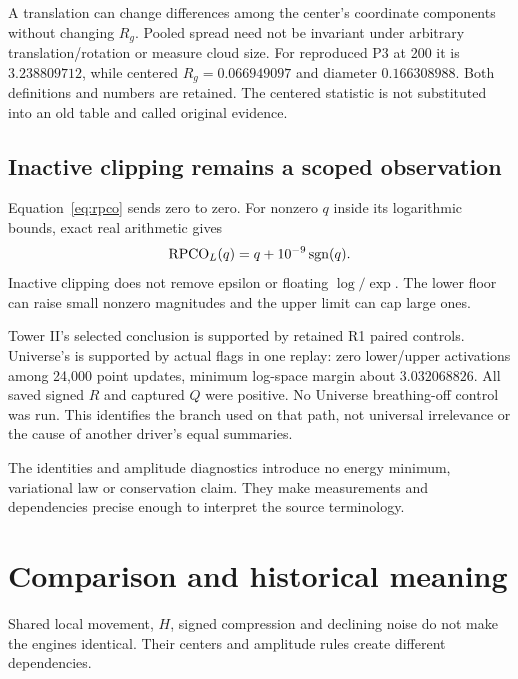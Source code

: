 A translation can change differences among the center's coordinate components without changing \(R_g\). Pooled spread need not be invariant under arbitrary translation/rotation or measure cloud size. For reproduced P3 at 200 it is \(3.238809712\), while centered \(R_g=0.066949097\) and diameter \(0.166308988\). Both definitions and numbers are retained. The centered statistic is not substituted into an old table and called original evidence.

\subsection{Inactive clipping remains a scoped observation}
Equation~\eqref{eq:rpco} sends zero to zero. For nonzero \(q\) inside its logarithmic bounds, exact real arithmetic gives
\begin{equation}\label{eq:eps}
\operatorname{RPCO}_L(q)=q+10^{-9}\operatorname{sgn}(q).
\end{equation}
Inactive clipping does not remove epsilon or floating \(\log/\exp\). The lower floor can raise small nonzero magnitudes and the upper limit can cap large ones.

Tower II's selected conclusion is supported by retained R1 paired controls. Universe's is supported by actual flags in one replay: zero lower/upper activations among 24,000 point updates, minimum log-space margin about \(3.032068826\). All saved signed \(R\) and captured \(Q\) were positive. No Universe breathing-off control was run. This identifies the branch used on that path, not universal irrelevance or the cause of another driver's equal summaries.

The identities and amplitude diagnostics introduce no energy minimum, variational law or conservation claim. They make measurements and dependencies precise enough to interpret the source terminology.

\section{Comparison and historical meaning}\label{sec:comparison}
Shared local movement, \(H\), signed compression and declining noise do not make the engines identical. Their centers and amplitude rules create different dependencies.

